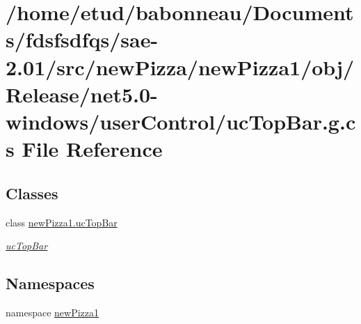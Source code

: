 \hypertarget{Release_2net5_80-windows_2userControl_2ucTopBar_8g_8cs}{}\section{/home/etud/babonneau/\+Documents/fdsfsdfqs/sae-\/2.01/src/new\+Pizza/new\+Pizza1/obj/\+Release/net5.0-\/windows/user\+Control/uc\+Top\+Bar.g.\+cs File Reference}
\label{Release_2net5_80-windows_2userControl_2ucTopBar_8g_8cs}
\subsection*{Classes}
\begin{DoxyCompactItemize}
\item 
class \hyperlink{classnewPizza1_1_1ucTopBar}{new\+Pizza1.\+uc\+Top\+Bar}
\begin{DoxyCompactList}\small\item\em \hyperlink{classnewPizza1_1_1ucTopBar}{uc\+Top\+Bar} \end{DoxyCompactList}\end{DoxyCompactItemize}
\subsection*{Namespaces}
\begin{DoxyCompactItemize}
\item 
namespace \hyperlink{namespacenewPizza1}{new\+Pizza1}
\end{DoxyCompactItemize}
